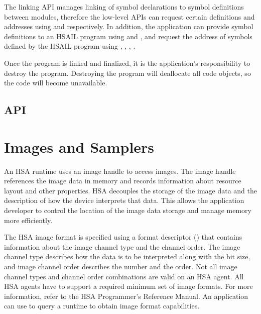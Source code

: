 \documentclass[final,oneside]{book}
\begin{document}
The linking API manages linking of symbol declarations to symbol definitions
between modules, therefore the low-level APIs can request certain definitions
and addresses using  and
 respectively. In addition, the
application can provide symbol definitions to an HSAIL program using
 and
, and request the address of
symbols defined by the HSAIL program using
,
,
,
.

Once the program is linked and finalized, it is the application's responsibility
to destroy the program. Destroying the program will deallocate all code objects,
so the code will become unavailable.

\subsection{API}



\section{Images and Samplers}\label{images}

An HSA runtime uses an image handle  to access
images. The image handle references the image data in memory and records
information about resource layout and other properties. HSA decouples the
storage of the image data and the description of how the device interprets that
data. This allows the application developer to control the location of the
image data storage and manage memory more efficiently.

The HSA image format is specified using a format descriptor
() that contains information about the image
channel type and the channel order. The image channel type describes how the
data is to be interpreted along with the bit size, and image channel order
describes the number and the order. Not all image channel types and channel
order combinations are valid on an HSA agent. All HSA agents have to support a
required minimum set of image formats. For more information, refer to the HSA
Programmer's Reference Manual\cite{prm}. An application can use
 to query a runtime
to obtain image format capabilities.
\end{document}
